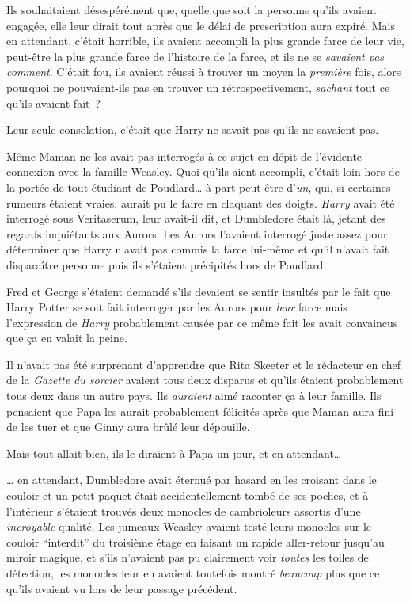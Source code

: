 Ils souhaitaient désespérément que, quelle que soit la personne qu'ils avaient engagée, elle leur dirait tout après que le délai de prescription aura expiré. Mais en attendant, c'était horrible, ils avaient accompli la plus grande farce de leur vie, peut-être la plus grande farce de l'histoire de la farce, et ils ne se \emph{savaient pas comment}. C'était fou, ils avaient réussi à trouver un moyen la \emph{première} fois, alors pourquoi ne pouvaient-ils pas en trouver un rétrospectivement, \emph{sachant} tout ce qu'ils avaient fait~?

Leur seule consolation, c'était que Harry ne savait pas qu'ils ne savaient pas.

Même Maman ne les avait pas interrogés à ce sujet en dépit de l'évidente connexion avec la famille Weasley. Quoi qu'ils aient accompli, c'était loin hors de la portée de tout étudiant de Poudlard… à part peut-être d'\emph{un}, qui, si certaines rumeurs étaient vraies, aurait pu le faire en claquant des doigts. \emph{Harry} avait été interrogé sous Veritaserum, leur avait-il dit, et Dumbledore était là, jetant des regards inquiétants aux Aurors. Les Aurors l'avaient interrogé juste assez pour déterminer que Harry n'avait pas commis la farce lui-même et qu'il n'avait fait disparaître personne puis ils s'étaient précipités hors de Poudlard.

Fred et George s'étaient demandé s'ils devaient se sentir insultés par le fait que Harry Potter se soit fait interroger par les Aurors pour \emph{leur} farce mais l'expression de \emph{Harry} probablement causée par ce même fait les avait convaincus que ça en valait la peine.

Il n'avait pas été surprenant d'apprendre que Rita Skeeter et le rédacteur en chef de la \emph{Gazette du sorcier} avaient tous deux disparus et qu'ils étaient probablement tous deux dans un autre pays. Ils \emph{auraient} aimé raconter ça à leur famille. Ils pensaient que Papa les aurait probablement félicités après que Maman aura fini de les tuer et que Ginny aura brûlé leur dépouille.

Mais tout allait bien, ils le diraient à Papa un jour, et en attendant…

… en attendant, Dumbledore avait éternué par hasard en les croisant dans le couloir et un petit paquet était accidentellement tombé de ses poches, et à l'intérieur s'étaient trouvés deux monocles de cambrioleurs assortis d'une \emph{incroyable} qualité. Les jumeaux Weasley avaient testé leurs monocles sur le couloir “interdit” du troisième étage en faisant un rapide aller-retour jusqu'au miroir magique, et s'ils n'avaient pas pu clairement voir \emph{toutes} les toiles de détection, les monocles leur en avaient toutefois montré \emph{beaucoup} plus que ce qu'ils avaient vu lors de leur passage précédent.

